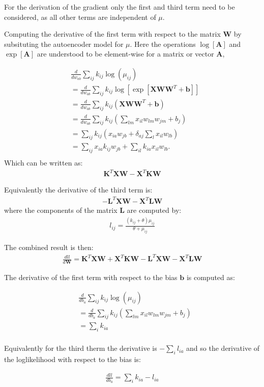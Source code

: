 \documentclass[11pt]{letter}
\newcommand{\matr}[1]{\mathbf{#1}}
\begin{document}
For the derivation of the gradient only the first and third term need to be considered, 
as all other terms are independent of $\mu$.

Computing the derivative of the first term with respect to the matrix $\matr{W}$ by subsituting the autoencoder model for $\mu$. 
Here the operations $\log[\matr{A}]$ and $\exp[\matr{A}]$ are understood to be element-wise for a matrix or vector $\matr{A}$,

\begin{align*}
&\frac{d}{dw_{ab}}\sum_{ij} k_{ij} \log{(\mu_{ij})} \\
&= \frac{d}{dw_{ab}}\sum_{ij} k_{ij} \log{[\exp{[\matr{X} \matr{W} \matr{W}^T + \matr{b}]}]} \\
&= \frac{d}{dw_{ab}}\sum_{ij} k_{ij} \left (\matr{X} \matr{W} \matr{W}^T + \matr{b} \right ) \\
&= \frac{d}{dw_{ab}}\sum_{ij} k_{ij} \left (\sum_{lm} x_{il} w_{lm} w_{jm} + b_j \right ) \\
&= \sum_{ij} k_{ij} \left (x_{ia} w_{jb} + \delta_{aj} \sum_{l} x_{il}w_{lb} \right ) \\
&= \sum_{ij} x_{ia} k_{ij} w_{jb} + \sum_{il} k_{ia} x_{il} w_{lb}. \\
\end{align*}
Which can be written as:
\begin{align*}
\matr{K}^T \matr{X} \matr{W} - \matr{X}^T \matr{K} \matr{W}
\end{align*}

Equivalently the derivative of the third term is:
\begin{align*}
-\matr{L}^T \matr{X} \matr{W} - \matr{X}^T \matr{L} \matr{W}
\end{align*}
where the components of the matrix $\matr{L}$ are computed by:
\begin{align*}
l_{ij} = \frac{(k_{ij} + \theta) \mu_{ij}}{\theta + \mu_{ij}}   
\end{align*}

The combined result is then:
\begin{align*}
\frac{dll}{d\matr{W}} = \matr{K}^T \matr{X} \matr{W} + \matr{X}^T \matr{K} \matr{W} - 
\matr{L}^T \matr{X} \matr{W} - \matr{X}^T \matr{L} \matr{W}
\end{align*}


The derivative of the first term with respect to the bias $\matr{b}$ is computed as:

\begin{align*}
&\frac{d}{db_{a}}\sum_{ij} k_{ij} \log{(\mu_{ij})} \\
&= \frac{d}{db_{a}}\sum_{ij} k_{ij} \left (\sum_{lm} x_{il} w_{lm} w_{jm} + b_j \right) \\
&= \sum_{i} k_{ia}\\
\end{align*}

Equivalently for the third therm the derivative is $-\sum_{i} l_{ia}$ and so the derivative of the loglikelihood with respect to the bias is:

\begin{align*}
\frac{dll}{db_a} = \sum_{i} k_{ia} - l_{ia}\\
\end{align*}
\end{document}
